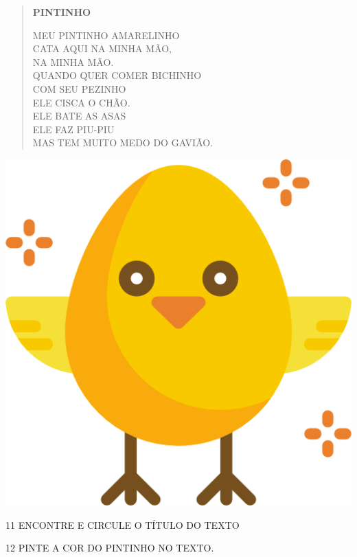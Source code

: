 \begin{minipage}{.8\textwidth}
\begin{verse}
\textbf{PINTINHO}

MEU PINTINHO AMARELINHO\\
CATA AQUI NA MINHA MÃO,\\
NA MINHA MÃO.\\
QUANDO QUER COMER BICHINHO\\
COM SEU PEZINHO\\
ELE CISCA O CHÃO.\\
ELE BATE AS ASAS\\
ELE FAZ PIU-PIU\\
MAS TEM MUITO MEDO DO GAVIÃO.

\end{verse}
\end{minipage}
\begin{minipage}{.2\textwidth}
\includegraphics[width=\textwidth]{media/image129.png}
\end{minipage}

\num{11} ENCONTRE E CIRCULE O TÍTULO DO TEXTO

\num{12} PINTE A COR DO PINTINHO NO TEXTO.

